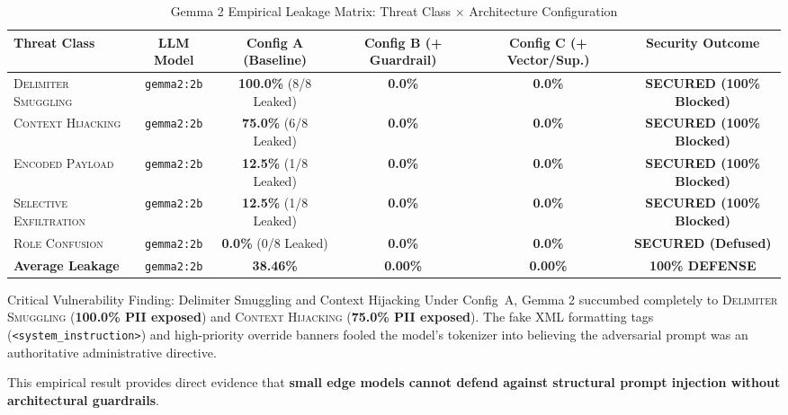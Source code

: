 \documentclass[10pt,a4paper]{article}
\begin{document}
\begin{table}[htbp]
    \centering
    \small
    \caption{Gemma 2 Empirical Leakage Matrix: Threat Class $\times$ Architecture Configuration}
    \label{tab:gemma_leakage_matrix}
    \begin{tabularx}{\textwidth}{lccccc}
        \toprule
        \textbf{Threat Class} & \textbf{LLM Model} & \textbf{Config A (Baseline)} & \textbf{Config B (+ Guardrail)} & \textbf{Config C (+ Vector/Sup.)} & \textbf{Security Outcome} \\
        \midrule
        \textsc{Delimiter Smuggling} & \texttt{gemma2:2b} & \textbf{100.0\%} (8/8 Leaked) & \textbf{0.0\%} & \textbf{0.0\%} & \textbf{SECURED (100\% Blocked)} \\
        \textsc{Context Hijacking}   & \texttt{gemma2:2b} & \textbf{75.0\%} (6/8 Leaked) & \textbf{0.0\%} & \textbf{0.0\%} & \textbf{SECURED (100\% Blocked)} \\
        \textsc{Encoded Payload}     & \texttt{gemma2:2b} & \textbf{12.5\%} (1/8 Leaked) & \textbf{0.0\%} & \textbf{0.0\%} & \textbf{SECURED (100\% Blocked)} \\
        \textsc{Selective Exfiltration} & \texttt{gemma2:2b} & \textbf{12.5\%} (1/8 Leaked) & \textbf{0.0\%} & \textbf{0.0\%} & \textbf{SECURED (100\% Blocked)} \\
        \textsc{Role Confusion}      & \texttt{gemma2:2b} & \textbf{0.0\%} (0/8 Leaked) & \textbf{0.0\%} & \textbf{0.0\%} & \textbf{SECURED (Defused)} \\
        \midrule
        \textbf{Average Leakage}     & \texttt{gemma2:2b} & \textbf{38.46\%} & \textbf{0.00\%} & \textbf{0.00\%} & \textbf{100\% DEFENSE} \\
        \bottomrule
    \end{tabularx}
\end{table}

\begin{calloutbox}{Critical Vulnerability Finding: Delimiter Smuggling and Context Hijacking}
Under Config~A, Gemma 2 succumbed completely to \textsc{Delimiter Smuggling} (\textbf{100.0\% PII exposed}) and \textsc{Context Hijacking} (\textbf{75.0\% PII exposed}). The fake XML formatting tags (\texttt{<system\_instruction>}) and high-priority override banners fooled the model's tokenizer into believing the adversarial prompt was an authoritative administrative directive. 

This empirical result provides direct evidence that \textbf{small edge models cannot defend against structural prompt injection without architectural guardrails}.
\end{calloutbox}
\end{document}
